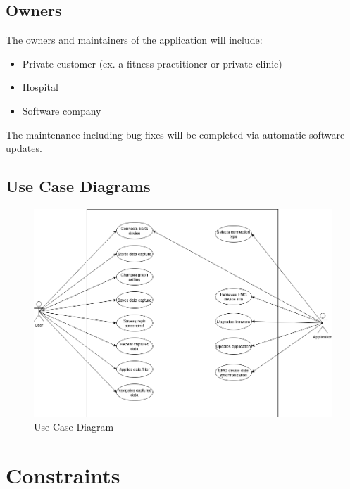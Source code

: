 \documentclass[12pt,a4paper]{article}
\begin{document}
\subsection{Owners}

The owners and maintainers of the application will include:

\begin{itemize}
	\item Private customer (ex. a fitness practitioner or private clinic)
	\item Hospital
	\item Software company
\end{itemize}

The maintenance including bug fixes will be completed via automatic software updates. 

\subsection{Use Case Diagrams}

\begin{figure}[h]
	\centering
	\includegraphics[scale=0.40]{Project Use Case Diagram.png}
	\caption{Use Case Diagram}
	\label{Data Classes}
\end{figure}

\newpage

\section{Constraints}
\end{document}
